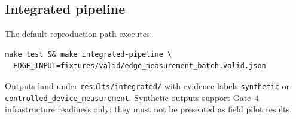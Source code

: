 \subsection{Integrated pipeline}
The default reproduction path executes:
\begin{verbatim}
make test && make integrated-pipeline \
  EDGE_INPUT=fixtures/valid/edge_measurement_batch.valid.json
\end{verbatim}
Outputs land under \texttt{results/integrated/} with evidence labels \texttt{synthetic} or \texttt{controlled\_device\_measurement}.
Synthetic outputs support Gate~4 infrastructure readiness only; they must not be presented as field pilot results.
